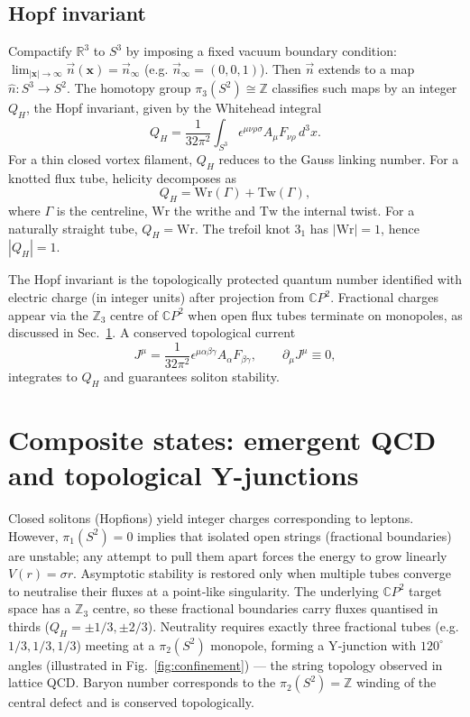 \documentclass[12pt,a4paper]{article}
\begin{document}
\subsection{Hopf invariant}
Compactify $\mathbb{R}^3$ to $S^3$ by imposing a fixed vacuum boundary condition: $\lim_{|\mathbf{x}|\to\infty}\vec{n}(\mathbf{x})=\vec{n}_\infty$ (e.g. $\vec{n}_\infty=(0,0,1)$). Then $\vec{n}$ extends to a map $\hat{n}:S^3\to S^2$. The homotopy group $\pi_3(S^2)\cong\mathbb{Z}$ classifies such maps by an integer $Q_H$, the Hopf invariant, given by the Whitehead integral
\begin{equation}
Q_H = \frac{1}{32\pi^2}\int_{S^3}\epsilon^{\mu\nu\rho\sigma} A_\mu F_{\nu\rho}\,d^3x.
\end{equation}
For a thin closed vortex filament, $Q_H$ reduces to the Gauss linking number. For a knotted flux tube, helicity decomposes as \cite{Moffatt1969,Ricca2011}
\begin{equation}
Q_H = \mathrm{Wr}(\Gamma) + \mathrm{Tw}(\Gamma),
\end{equation}
where $\Gamma$ is the centreline, $\mathrm{Wr}$ the writhe and $\mathrm{Tw}$ the internal twist. For a naturally straight tube, $Q_H = \mathrm{Wr}$. The trefoil knot $3_1$ has $|\mathrm{Wr}|=1$, hence $|Q_H|=1$.

The Hopf invariant is the topologically protected quantum number identified with electric charge (in integer units) after projection from $\mathbb{C}P^2$. Fractional charges appear via the $\mathbb{Z}_3$ centre of $\mathbb{C}P^2$ when open flux tubes terminate on monopoles, as discussed in Sec.~\ref{sec:confinement}. A conserved topological current
\begin{equation}
J^\mu = \frac{1}{32\pi^2}\epsilon^{\mu\alpha\beta\gamma}A_\alpha F_{\beta\gamma},\qquad \partial_\mu J^\mu\equiv0,
\end{equation}
integrates to $Q_H$ and guarantees soliton stability.

\section{Composite states: emergent QCD and topological Y-junctions}
\label{sec:confinement}

Closed solitons (Hopfions) yield integer charges corresponding to leptons. However, $\pi_1(S^2)=0$ implies that isolated open strings (fractional boundaries) are unstable; any attempt to pull them apart forces the energy to grow linearly $V(r)=\sigma r$. Asymptotic stability is restored only when multiple tubes converge to neutralise their fluxes at a point‑like singularity. The underlying $\mathbb{C}P^2$ target space has a $\mathbb{Z}_3$ centre, so these fractional boundaries carry fluxes quantised in thirds ($Q_H=\pm1/3,\pm2/3$). Neutrality requires exactly three fractional tubes (e.g. $1/3,1/3,1/3$) meeting at a $\pi_2(S^2)$ monopole, forming a Y‑junction with $120^\circ$ angles (illustrated in Fig.~\ref{fig:confinement}) --- the string topology observed in lattice QCD. Baryon number corresponds to the $\pi_2(S^2)=\mathbb{Z}$ winding of the central defect and is conserved topologically.
\end{document}
